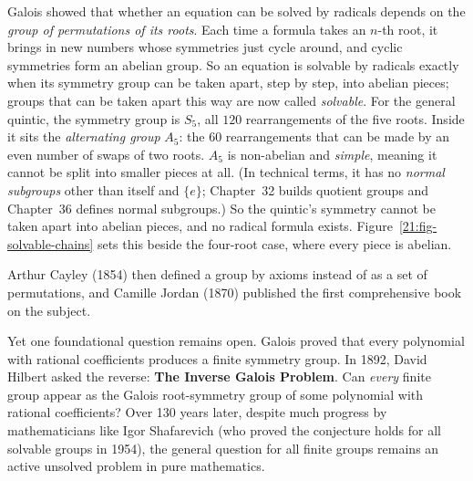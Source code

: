 \begin{historybox}
Galois showed that whether an equation can be solved by radicals depends on the \emph{group of permutations of its roots}. Each time a formula takes an $n$-th root, it brings in new numbers whose symmetries just cycle around, and cyclic symmetries form an abelian group. So an equation is solvable by radicals exactly when its symmetry group can be taken apart, step by step, into abelian pieces; groups that can be taken apart this way are now called \emph{solvable}.
For the general quintic, the symmetry group is $S_5$, all $120$ rearrangements of the five roots. Inside it sits the \emph{alternating group} $A_5$: the $60$ rearrangements that can be made by an even number of swaps of two roots. $A_5$ is non-abelian and \emph{simple}, meaning it cannot be split into smaller pieces at all. (In technical terms, it has no \emph{normal subgroups} other than itself and $\{e\}$; Chapter~32 builds quotient groups and Chapter~36 defines normal subgroups.) So the quintic's symmetry cannot be taken apart into abelian pieces, and no radical formula exists. Figure~\ref{21:fig-solvable-chains} sets this beside the four-root case, where every piece is abelian.

Arthur Cayley (1854) then defined a group by axioms instead of as a set of permutations, and Camille Jordan (1870) published the first comprehensive book on the subject.

Yet one foundational question remains open. Galois proved that every polynomial with rational coefficients produces a finite symmetry group. In 1892, David Hilbert asked the reverse: \textbf{The Inverse Galois Problem}. Can \emph{every} finite group appear as the Galois root-symmetry group of some polynomial with rational coefficients? Over 130 years later, despite much progress by mathematicians like Igor Shafarevich (who proved the conjecture holds for all solvable groups in 1954), the general question for all finite groups remains an active unsolved problem in pure mathematics.
\end{historybox}

